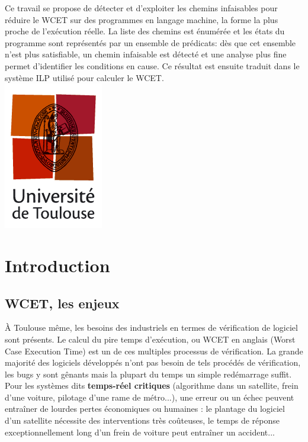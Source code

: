 \documentclass[french]{article}
\begin{document}
\begin{titlepage}
{    Ce travail se propose de détecter et d'exploiter les chemins
    infaisables pour réduire le WCET sur des programmes en langage machine,
    la forme la plus proche de l'exécution réelle. La liste des chemins 
    est énumérée et les états du programme sont représentés par un
    ensemble de prédicats: dès que cet ensemble n'est plus satisfiable,
    un chemin infaisable est détecté et une analyse plus fine
    permet d'identifier les conditions en cause. Ce résultat
    est ensuite traduit dans le système ILP utilisé pour calculer le WCET.
  }\\
  \vfill
  \center
    \includegraphics[scale=0.5]{pictures/logo_univ_tlse.png}\\
  \end{titlepage}

  \pagebreak{}
  \tableofcontents{}


  \newpage{}
  \section{Introduction}
  \subsection{WCET, les enjeux}
  \`A Toulouse même, les besoins des industriels en termes de vérification de logiciel sont présents. Le calcul du pire temps d'exécution, ou WCET en anglais (Worst Case Execution Time) est un de ces multiples processus de vérification. La grande majorité des logiciels développés n'ont pas besoin de tels procédés de vérification, les bugs y sont gênants mais la plupart du temps un simple redémarrage suffit. Pour les systèmes dits \textbf{temps-réel critiques} (algorithme dans un satellite, frein d'une voiture, pilotage d'une rame de métro...), une erreur ou un échec peuvent entraîner de lourdes pertes économiques ou humaines : le plantage du logiciel d'un satellite nécessite des interventions très coûteuses, le temps de réponse exceptionnellement long d'un frein de voiture peut entraîner un accident...
\end{document}
